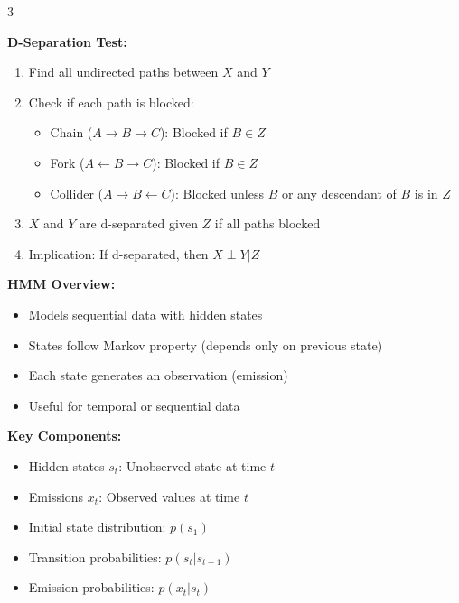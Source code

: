 \documentclass[10pt,landscape]{article}
\begin{document}
\begin{multicols}{3}
\begin{tcolorbox}[breakable, title=8.1 Bayesian Networks and Inference, colback=graphical]
\textbf{D-Separation Test:}
\begin{enumerate}[leftmargin=*,noitemsep,topsep=0pt]
    \item Find all undirected paths between $X$ and $Y$
    \item Check if each path is blocked:
    \begin{itemize}[leftmargin=*,noitemsep]
        \item Chain ($A \rightarrow B \rightarrow C$): Blocked if $B \in Z$
        \item Fork ($A \leftarrow B \rightarrow C$): Blocked if $B \in Z$
        \item Collider ($A \rightarrow B \leftarrow C$): Blocked unless $B$ or any descendant of $B$ is in $Z$
    \end{itemize}
    \item $X$ and $Y$ are d-separated given $Z$ if all paths blocked
    \item Implication: If d-separated, then $X \perp Y | Z$
\end{enumerate}
\end{tcolorbox}

\begin{tcolorbox}[breakable, title=9. Hidden Markov Models Concepts, colback=hmm]
\textbf{HMM Overview:}
\begin{itemize}[leftmargin=*,noitemsep,topsep=0pt]
    \item Models sequential data with hidden states
    \item States follow Markov property (depends only on previous state)
    \item Each state generates an observation (emission)
    \item Useful for temporal or sequential data
\end{itemize}

\textbf{Key Components:}
\begin{itemize}[leftmargin=*,noitemsep,topsep=0pt]
    \item Hidden states $s_t$: Unobserved state at time $t$
    \item Emissions $x_t$: Observed values at time $t$
    \item Initial state distribution: $p(s_1)$
    \item Transition probabilities: $p(s_t|s_{t-1})$
    \item Emission probabilities: $p(x_t|s_t)$
\end{itemize}


\end{tcolorbox}
\end{multicols}
\end{document}
